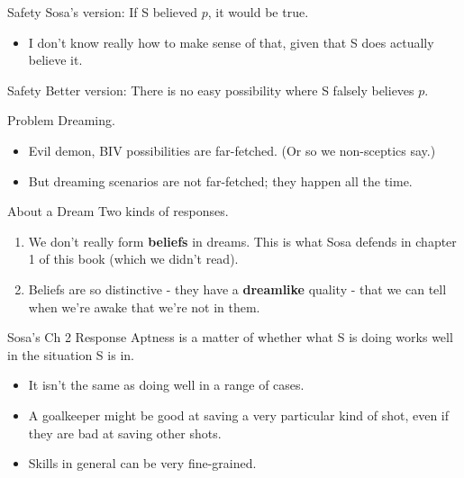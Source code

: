 \documentclass[
  17pt,
  letterpaper,
  ignorenonframetext,
  aspectratio=169,
  handout]{beamer}
\providecommand{\tightlist}{%
  \setlength{\itemsep}{0pt}\setlength{\parskip}{0pt}}\usepackage{longtable,booktabs,array}
\begin{document}
\begin{frame}{Safety}
\protect\hypertarget{safety}{}
Sosa's version: If S believed \(p\), it would be true.

\begin{itemize}[<+->]
\tightlist
\item
  I don't know really how to make sense of that, given that S does
  actually believe it.
\end{itemize}
\end{frame}

\begin{frame}{Safety}
\protect\hypertarget{safety-1}{}
Better version: There is no easy possibility where S falsely believes
\(p\).
\end{frame}

\begin{frame}{Problem}
\protect\hypertarget{problem}{}
Dreaming.

\begin{itemize}[<+->]
\tightlist
\item
  Evil demon, BIV possibilities are far-fetched. (Or so we non-sceptics
  say.)
\item
  But dreaming scenarios are not far-fetched; they happen all the time.
\end{itemize}
\end{frame}

\begin{frame}{About a Dream}
\protect\hypertarget{about-a-dream}{}
Two kinds of responses.

\begin{enumerate}[<+->]
\tightlist
\item
  We don't really form \textbf{beliefs} in dreams. This is what Sosa
  defends in chapter 1 of this book (which we didn't read).
\item
  Beliefs are so distinctive - they have a \textbf{dreamlike} quality -
  that we can tell when we're awake that we're not in them.
\end{enumerate}
\end{frame}

\begin{frame}{Sosa's Ch 2 Response}
\protect\hypertarget{sosas-ch-2-response}{}
Aptness is a matter of whether what S is doing works well in the
situation S is in.

\begin{itemize}[<+->]
\tightlist
\item
  It isn't the same as doing well in a range of cases.
\item
  A goalkeeper might be good at saving a very particular kind of shot,
  even if they are bad at saving other shots.
\item
  Skills in general can be very fine-grained.
\end{itemize}
\end{frame}
\end{document}
